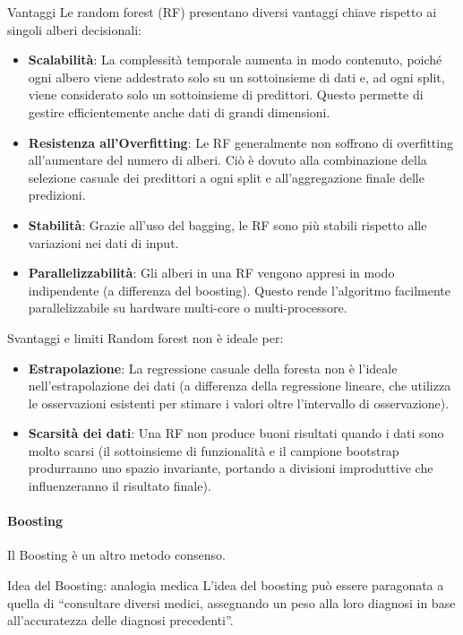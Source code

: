 \begin{nota}{Vantaggi}{}
Le random forest (RF) presentano diversi vantaggi chiave rispetto ai singoli alberi
decisionali:
\begin{itemize}
    \item \textbf{Scalabilità}: La complessità temporale aumenta in modo
    contenuto, poiché ogni albero viene addestrato solo su un sottoinsieme di
    dati e, ad ogni split, viene considerato solo un sottoinsieme di
    predittori. Questo permette di gestire efficientemente anche dati di
    grandi dimensioni.
    \item \textbf{Resistenza all'Overfitting}: Le RF generalmente non soffrono
    di overfitting all'aumentare del numero di alberi. Ciò è dovuto alla
    combinazione della selezione casuale dei predittori a ogni split e
    all'aggregazione finale delle predizioni.
    \item \textbf{Stabilità}: Grazie all'uso del bagging, le RF sono più
    stabili rispetto alle variazioni nei dati di input.
    \item \textbf{Parallelizzabilità}: Gli alberi in una RF vengono appresi in
    modo indipendente (a differenza del boosting). Questo rende l'algoritmo
    facilmente parallelizzabile su hardware multi-core o multi-processore.
\end{itemize}
\end{nota}


\begin{nota}{Svantaggi e limiti}{}
Random forest non è ideale per:
\begin{itemize}
    \item \textbf{Estrapolazione}: La regressione casuale della foresta non è l'ideale
    nell'estrapolazione dei dati (a differenza della regressione lineare, che
    utilizza le osservazioni esistenti per stimare i valori oltre l'intervallo di
    osservazione).
    \item \textbf{Scarsità dei dati}: Una RF non produce buoni
    risultati quando i dati sono molto scarsi (il sottoinsieme di funzionalità
    e il campione bootstrap produrranno uno spazio invariante, portando a
    divisioni improduttive che influenzeranno il risultato finale).
\end{itemize}

\end{nota}

\paragraph{Boosting}
Il Boosting è un altro metodo consenso.
\begin{nota}{Idea del Boosting: analogia medica}{}
    L'idea del boosting può essere paragonata a quella di ``consultare diversi
    medici, assegnando un peso alla loro diagnosi in base all'accuratezza
    delle diagnosi precedenti''.
\end{nota}

